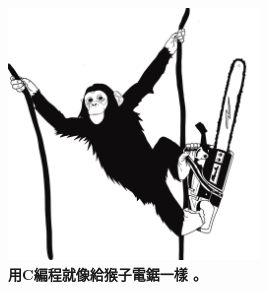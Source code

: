 \documentclass[11pt]{article}
\begin{document}
\begin{center}
  \includegraphics[width=0.5\textwidth]{../../images/monkey-chainsaw.jpg} \\
  \vspace{10pt}
  \textbf{用C編程就像給猴子電鋸一樣 。}
\end{center}
\end{document}
